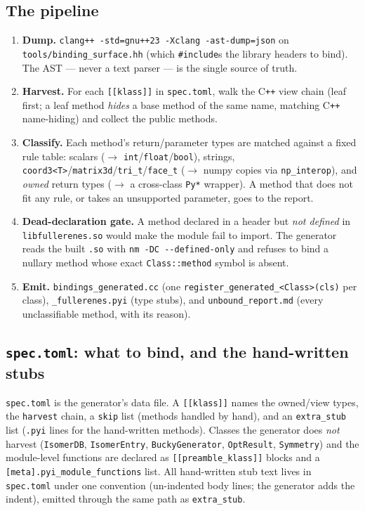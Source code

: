 \documentclass[11pt]{article}
\newcommand{\code}[1]{\lstinline[style=py]!#1!}
\begin{document}
\subsection{The pipeline}
\begin{enumerate}[leftmargin=1.6em]
\item \textbf{Dump.} \code{clang++ -std=gnu++23 -Xclang -ast-dump=json} on
  \texttt{tools/binding\_surface.hh} (which \texttt{\#include}s the library headers to bind).
  The AST --- never a text parser --- is the single source of truth.
\item \textbf{Harvest.} For each \texttt{[[klass]]} in \texttt{spec.toml}, walk the C\texttt{++}
  view chain (leaf first; a leaf method \emph{hides} a base method of the same name, matching
  C\texttt{++} name-hiding) and collect the public methods.
\item \textbf{Classify.} Each method's return/parameter types are matched against a fixed
  rule table: scalars ($\to$ \texttt{int}/\texttt{float}/\texttt{bool}), strings,
  \texttt{coord3<T>}/\texttt{matrix3d}/\texttt{tri\_t}/\texttt{face\_t} ($\to$ numpy copies via
  \texttt{np\_interop}), and \emph{owned} return types ($\to$ a cross-class \texttt{Py*}
  wrapper). A method that does not fit any rule, or takes an unsupported parameter, goes to
  the report.
\item \textbf{Dead-declaration gate.} A method declared in a header but \emph{not defined}
  in \texttt{libfullerenes.so} would make the module fail to import. The generator reads the
  built \texttt{.so} with \code{nm -DC --defined-only} and refuses to bind a nullary method
  whose exact \texttt{Class::method} symbol is absent.
\item \textbf{Emit.} \texttt{bindings\_generated.cc} (one
  \texttt{register\_generated\_<Class>(cls)} per class), \texttt{\_fullerenes.pyi} (type
  stubs), and \texttt{unbound\_report.md} (every unclassifiable method, with its reason).
\end{enumerate}

\subsection{\texttt{spec.toml}: what to bind, and the hand-written stubs}
\texttt{spec.toml} is the generator's data file. A \texttt{[[klass]]} names the owned/view
types, the \texttt{harvest} chain, a \texttt{skip} list (methods handled by hand), and an
\texttt{extra\_stub} list (\texttt{.pyi} lines for the hand-written methods). Classes the
generator does \emph{not} harvest (\texttt{IsomerDB}, \texttt{IsomerEntry},
\texttt{BuckyGenerator}, \texttt{OptResult}, \texttt{Symmetry}) and the module-level
functions are declared as \texttt{[[preamble\_klass]]} blocks and a
\texttt{[meta].pyi\_module\_functions} list. All hand-written stub text lives in
\texttt{spec.toml} under one convention (un-indented body lines; the generator adds the
indent), emitted through the same path as \texttt{extra\_stub}.
\end{document}

